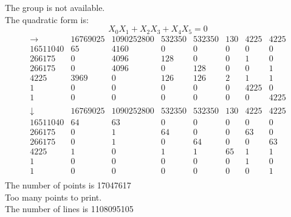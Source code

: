 The group is not available.\\
The quadratic form is: 
$$
X_0X_1 + X_2X_3 + X_4X_5 = 0$$
$$
\begin{array}{r|*{7}{r}}
\rightarrow  & 16769025 & 1090252800 & 532350 & 532350 &    130 &   4225 &   4225\\
\hline
16511040 &           65 &         4160 &            0 &            0 &            0 &            0 &            0\\
266175 &            0 &         4096 &          128 &            0 &            0 &            1 &            0\\
266175 &            0 &         4096 &            0 &          128 &            0 &            0 &            1\\
  4225 &         3969 &            0 &          126 &          126 &            2 &            1 &            1\\
     1 &            0 &            0 &            0 &            0 &            0 &         4225 &            0\\
     1 &            0 &            0 &            0 &            0 &            0 &            0 &         4225\\
\end{array}
$$
$$
\begin{array}{r|*{7}{r}}
\downarrow  & 16769025 & 1090252800 & 532350 & 532350 &    130 &   4225 &   4225\\
\hline
16511040 &           64 &           63 &            0 &            0 &            0 &            0 &            0\\
266175 &            0 &            1 &           64 &            0 &            0 &           63 &            0\\
266175 &            0 &            1 &            0 &           64 &            0 &            0 &           63\\
  4225 &            1 &            0 &            1 &            1 &           65 &            1 &            1\\
     1 &            0 &            0 &            0 &            0 &            0 &            1 &            0\\
     1 &            0 &            0 &            0 &            0 &            0 &            0 &            1\\
\end{array}
$$
The number of points is 17047617\\
Too many points to print.\\
The number of lines is 1108095105\\
